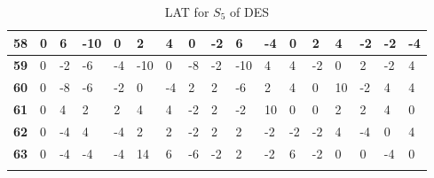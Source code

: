 \begin{longtable}[c]{|l|l|l|l|l|l|l|l|l|l|l|l|l|l|l|l|l|}
\textbf{58} & 0          & 6          & -10        & 0          & 2          & 4          & 0          & -2         & 6          & -4         & 0           & 2           & 4           & -2          & -2          & -4          \\ \hline
\textbf{59} & 0          & -2         & -6         & -4         & -10        & 0          & -8         & -2         & -10        & 4          & 4           & -2          & 0           & 2           & -2          & 4           \\ \hline
\textbf{60} & 0          & -8         & -6         & -2         & 0          & -4         & 2          & 2          & -6         & 2          & 4           & 0           & 10          & -2          & 4           & 4           \\ \hline
\textbf{61} & 0          & 4          & 2          & 2          & 4          & 4          & -2         & 2          & -2         & 10         & 0           & 0           & 2           & 2           & 4           & 0           \\ \hline
\textbf{62} & 0          & -4         & 4          & -4         & 2          & 2          & -2         & 2          & 2          & -2         & -2          & -2          & 4           & -4          & 0           & 4           \\ \hline
\textbf{63} & 0          & -4         & -4         & -4         & 14         & 6          & -6         & -2         & 2          & -2         & 6           & -2          & 0           & 0           & -4          & 0           \\ \hline
\caption{LAT for $S_5$ of DES}
\label{tbl:lat5}
\end{longtable}